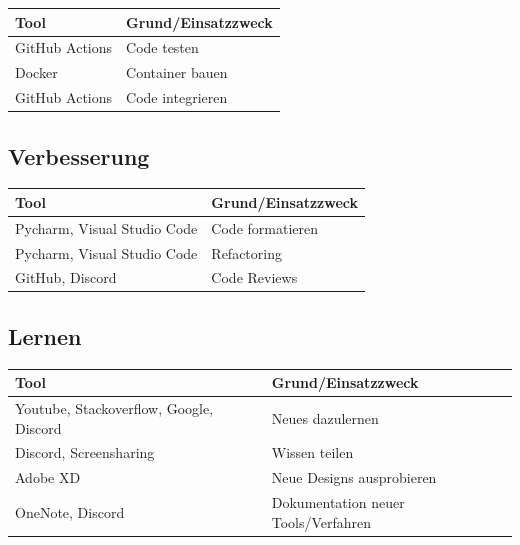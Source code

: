\documentclass[a4paper,11pt]{scrartcl}
\begin{document}
\begin{table}[H]
\begin{center}
\begin{tabular}{|p{4cm}|p{8cm}|}
\hline
\textbf{Tool} &\textbf{Grund/Einsatzzweck} \\ \hline
GitHub Actions & Code testen \\ \hline
Docker & Container bauen\\ \hline
GitHub Actions & Code integrieren\\ \hline
\end{tabular}
\end{center}
\end{table}
 
\subsection{Verbesserung}

\begin{table}[H]
\begin{center}
\begin{tabular}{|p{4cm}|p{8cm}|}
\hline
\textbf{Tool} &\textbf{Grund/Einsatzzweck} \\ \hline
Pycharm, Visual Studio Code & Code formatieren\\ \hline
Pycharm, Visual Studio Code & Refactoring\\ \hline
GitHub, Discord & Code Reviews\\ \hline
\end{tabular}
\end{center}
\end{table}

\subsection{Lernen}

\begin{table}[H]
\begin{center}
\begin{tabular}{|p{4cm}|p{8cm}|}
\hline
\textbf{Tool} &\textbf{Grund/Einsatzzweck} \\ \hline
Youtube, Stackoverflow, Google, Discord & Neues dazulernen\\ \hline
Discord, Screensharing & Wissen teilen\\ \hline
Adobe XD & Neue Designs ausprobieren\\ \hline
OneNote, Discord & Dokumentation neuer Tools/Verfahren\\ \hline
\end{tabular}
\end{center}
\end{table}
\end{document}
